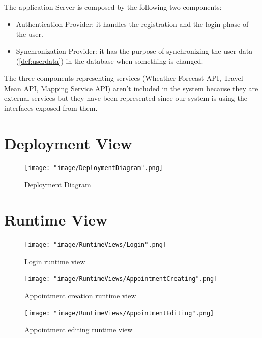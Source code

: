 The application Server is composed by the following two components:
\begin{itemize}

\item Authentication Provider: it handles the registration and the login phase of the user. 

\item Synchronization Provider: it has the purpose of synchronizing the user data (\ref{def:userdata}) in the database when something is changed.
 
\end{itemize}

The three components representing services (Wheather Forecast API, Travel Mean API, Mapping Service API) aren't included in the system because they are external services but they have been represented since our system is using the interfaces exposed from them.

\section{Deployment View}

\begin{figure}[H]
\begin{center}
\texttt{[image: "image/DeploymentDiagram".png]}
\caption{Deployment Diagram}
\end{center}
\end{figure}

\section{Runtime View}

\begin{figure}[H]
\begin{center}
\texttt{[image: "image/RuntimeViews/Login".png]}
\caption{Login runtime view}
\end{center}
\end{figure}

\begin{figure}[H]
\begin{center}
\texttt{[image: "image/RuntimeViews/AppointmentCreating".png]}
\caption{Appointment creation runtime view}
\end{center}
\end{figure}

\begin{figure}[H]
\begin{center}
\texttt{[image: "image/RuntimeViews/AppointmentEditing".png]}
\caption{Appointment editing runtime view}
\end{center}
\end{figure}

